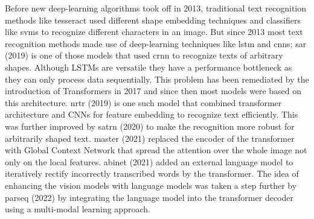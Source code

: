 Before new deep-learning algorithms took off in 2013, traditional text recognition methods like tesseract \cite{smith_overview_2007} used different shape embedding techniques and classifiers like \gls{svm}s to recognize different characters in an image. But since 2013 most text recognition methods made use of deep-learning techniques like \gls{lstm} and \gls{cnn}s; \gls{sar} \cite{li_show_2019} (2019) is one of those models that used \gls{crnn} to recognize texts of arbitrary shapes. Although LSTMs are versatile they have a performance bottleneck as they can only process data sequentially. This problem has been remediated by the introduction of Transformers \cite{vaswani_attention_2017} in 2017 and since then most models were based on this architecture. \gls{nrtr} \cite{sheng_nrtr_2019} (2019) is one such model that combined transformer architecture and CNNs for feature embedding to recognize text efficiently. This was further improved by \gls{satrn} \cite{lee_recognizing_2020} (2020) to make the recognition more robust for arbitrarily shaped text.  \gls{master} \cite{lu_master_2021} (2021) replaced the encoder of the transformer with Global Context Network that spread the attention over the whole image not only on the local features. \gls{abinet} \cite{fang_read_2021} (2021) added an external language model to iteratively rectify incorrectly transcribed words by the transformer. The idea of enhancing the vision models with language models was taken a step further by \gls{parseq} \cite{bautista_scene_2022} (2022) by integrating the language model into the transformer decoder using a multi-modal learning approach.